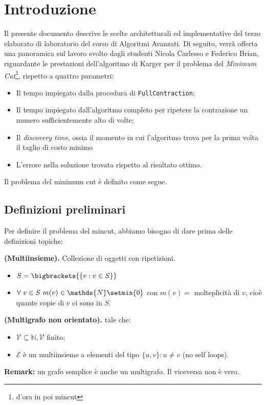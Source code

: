 \section{Introduzione}
Il presente documento descrive le scelte architetturali ed implementative del terzo elaborato di laboratorio del corso di Algoritmi Avanzati. Di seguito, verrà offerta una panoramica sul lavoro svolto dagli studenti Nicola Carlesso e Federico Brian, riguardante le prestazioni dell'algoritmo di Karger per il problema del \emph{Minimum Cut}\footnote{d'ora in poi mincut}, rispetto a quattro parametri:
\begin{itemize}
	\item Il tempo impiegato dalla procedura di \texttt{FullContraction};
	\item Il tempo impiegato dall'algoritmo completo per ripetere la contrazione un numero sufficientemente alto di volte;
	\item Il \emph{discovery time}, ossia il momento in cui l'algoritmo trova per la prima volta il taglio di costo minimo
	\item L'errore  nella soluzione trovata rispetto al risultato ottimo.
\end{itemize}
Il problema del minimum cut è definito come segue.

\subsection{Definizioni preliminari}
Per definire il problema del mincut, abbiamo bisogno di dare prima delle definizioni topiche:
\begin{defi} \textbf{(Multiinsieme).} Collezione di oggetti con ripetizioni.
\begin{itemize}
	\item $S = \bigbrackets{\{v: v\in S\}}$
	\item $\forall\ v\in S\ m(v)\in\mathds{N}\setmin \{0\}$ con $m(v) = $ molteplicità di $v$, cioè quante copie di $v$ ci sono in $S$.
\end{itemize}
\end{defi}
\begin{defi} \textbf{(Multigrafo non orientato).} \mgrafo tale che:
\begin{itemize}
	\item $\mathcal{V}\subseteq\mathds{N}, \mathcal{V}$ finito;
	\item $\mathcal{E}$ è un multiinsieme a elementi del tipo $\{u,v\} : u\neq v$ (no self loops).
\end{itemize}
\end{defi}
\textbf{Remark:} un grafo semplice \grafo è anche un multigrafo. Il viceversa non è vero.

